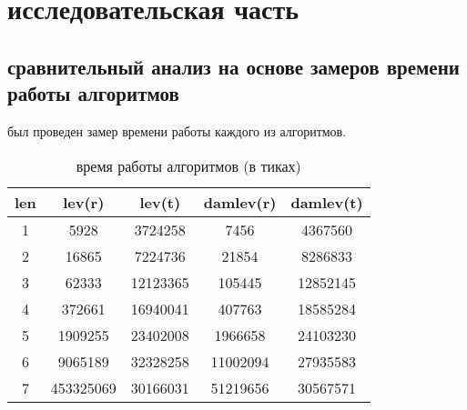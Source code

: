 \chapter{исследовательская часть}

\section{сравнительный анализ на основе замеров времени работы алгоритмов}

был проведен замер времени работы каждого из алгоритмов.


\begin{table} [h!]
\caption{время работы алгоритмов (в тиках)}
	\begin{tabular}{|c c c c c|} 
 	\hline
	len & lev(r) & lev(t) & damlev(r) & damlev(t) \\ [0.8ex] 
 	\hline\hline
 	1 & 5928 & 3724258 & 7456 & 4367560\\
 	\hline
 	2 & 16865 & 7224736 & 21854 & 8286833\\
 	\hline
	3 & 62333 & 12123365 & 105445 & 12852145\\
	\hline
	4 & 372661 & 16940041 & 407763 & 18585284\\
	\hline
	5 & 1909255 & 23402008 & 1966658 & 24103230\\
	\hline
	6 & 9065189 & 32328258 & 11002094 & 27935583\\
	\hline
	7 & 453325069 & 30166031 & 51219656 & 30567571\\
	\hline
	\end{tabular}
\end{table}




